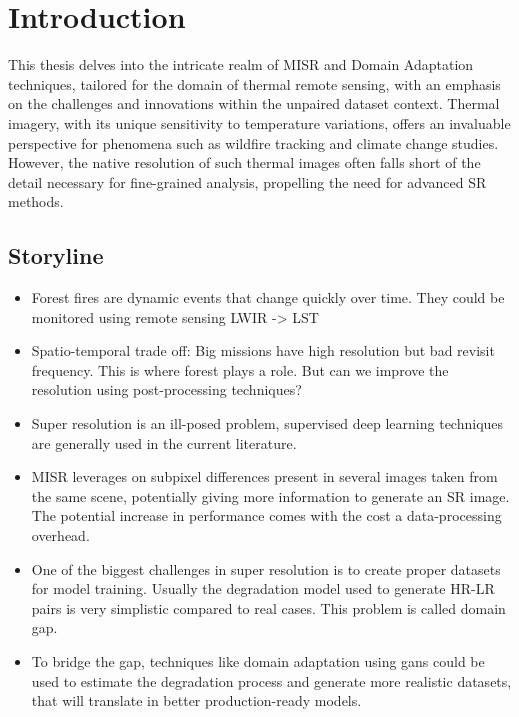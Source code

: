 \section{Introduction} \label{sec:intro}

This thesis delves into the intricate realm of MISR and Domain Adaptation techniques, tailored for the domain of thermal remote sensing, with an emphasis on the challenges and innovations within the unpaired dataset context. Thermal imagery, with its unique sensitivity to temperature variations, offers an invaluable perspective for phenomena such as wildfire tracking and climate change studies. However, the native resolution of such thermal images often falls short of the detail necessary for fine-grained analysis, propelling the need for advanced SR methods.

    \subsection{Storyline}

    \begin{itemize}
        \item Forest fires are dynamic events that change quickly over time. They could be monitored using remote sensing LWIR -> LST
        \item Spatio-temporal trade off: Big missions have high resolution but bad revisit frequency. This is where forest plays a role. But can we improve the resolution using post-processing techniques?
        \item Super resolution is an ill-posed problem, supervised deep learning techniques are generally used in the current literature.
        \item MISR leverages on subpixel differences present in several images taken from the same scene, potentially giving more information to generate an SR image. The potential increase in performance comes with the cost a data-processing overhead.
        \item One of the biggest challenges in super resolution is to create proper datasets for model training. Usually the degradation model used to generate HR-LR pairs is very simplistic compared to real cases. This problem is called domain gap.
        
        \item To bridge the gap, techniques like domain adaptation using gans could be used to estimate the degradation process and generate more realistic datasets, that will translate in better production-ready models.
        \end{itemize}

